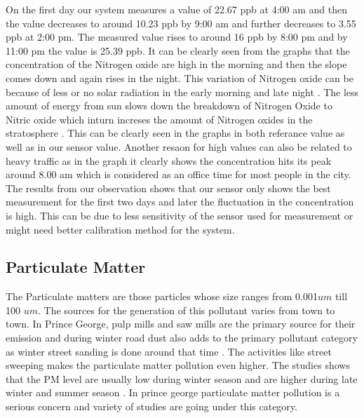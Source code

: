     On the first day our system measures a value of 22.67 ppb at 4:00 am and then the value decreases to around 10.23 ppb by 9:00 am and further decreases to 3.55 ppb at 2:00 pm. The measured value rises to around 16 ppb by 8:00 pm and by 11:00 pm the value is 25.39 ppb. It can be clearly seen from the graphs that the concentration of the Nitrogen oxide are high in the morning and then the slope comes down and again rises in the night. This variation of Nitrogen oxide can be because of less or no  solar radiation in the early morning and late night \cite{Environment2010} \cite{George2005}. The less amount of energy from sun slows down the breakdown of Nitrogen Oxide to Nitric oxide which inturn increses the amount of Nitrogen oxides in the stratosphere \cite{EnvironmentalQualitySectionMoE2012} \cite{Environment2010}. This can be clearly seen in the graphs in both referance value as well as in our sensor value. Another resaon for high values can also be related to heavy traffic as in the graph it clearly shows the concentration hits its peak around 8.00 am which is considered as an office time for most people in the city. The results from our observation shows that our sensor only shows the best measurement for the first two days and later the fluctuation in the concentration is high. This can be due to less sensitivity of the sensor used for measurement or might need better calibration method for the system.



\subsection{Particulate Matter}

The Particulate matters are those particles whose size ranges from 0.001$um$ till 100 $um$. The sources for the generation of this pollutant varies from town to town. In Prince George, pulp mills and saw mills are the primary source for their emission and during winter road dust also adds to the primary pollutant category as winter street sanding is done around that time \cite{Champagne1996}. The activities like street sweeping makes the particulate matter pollution even higher. The studies shows that the PM level are usually low during winter season and are higher during late winter and summer season \cite{EnvironmentalQualitySectionMoE2012}. In prince george particulate matter pollution is a serious concern and variety of studies are going under this category.

